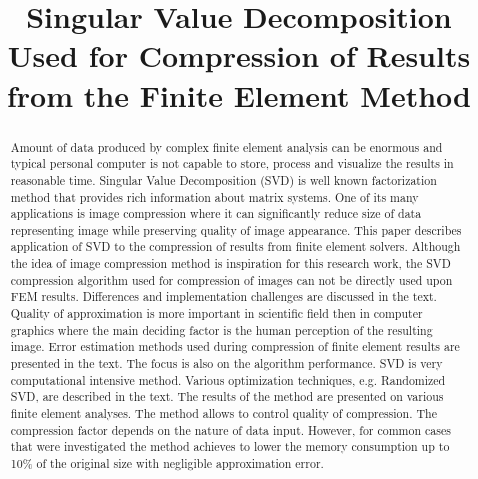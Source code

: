 \documentclass[preprint,12pt]{elsarticle}
\begin{document}
\begin{frontmatter}


\title{Singular Value Decomposition Used for Compression of Results from the Finite Element Method}




\author{}
\address{Prague, Czech Republic}

\begin{abstract}
Amount of data produced by complex finite element analysis can be enormous and typical personal computer is not capable to store, process and visualize the results in reasonable time. Singular Value Decomposition (SVD) is well known factorization method that provides rich information about matrix systems. One of its many applications is image compression where it can significantly reduce size of data representing image while preserving quality of image appearance.
\newline
This paper describes application of SVD to the compression of results from finite element solvers. Although the idea of image compression method is inspiration for this research work, the SVD compression algorithm used for compression of images can not be directly used upon FEM results. Differences and implementation challenges are discussed in the text. Quality of approximation is more important in scientific field then in computer graphics where the main deciding factor is the human perception of the resulting image. Error estimation methods used during compression of finite element results are presented in the text. The focus is also on the algorithm performance. SVD is very computational intensive method. Various optimization techniques, e.g. Randomized SVD, are described in the text.
\newline
The results of the method are presented on various finite element analyses. The method allows to control quality of compression. The compression factor depends on the nature of data input. However, for common cases that were investigated the method achieves to lower the memory consumption up to 10\% of the original size with negligible approximation error.


\end{abstract}
\end{frontmatter}
\end{document}
